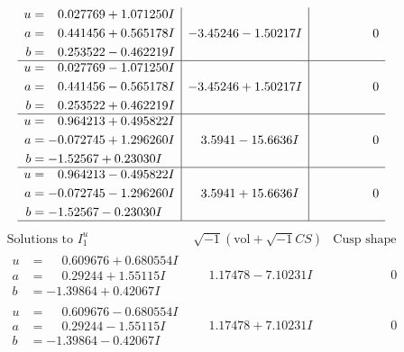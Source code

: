 \documentclass[1p]{elsarticle_modified}
\theoremstyle{definition}
\newcommand{\I}{\sqrt{-1}}
\begin{document}
$$\begin{array}{c|c|c}
\begin{aligned}
u &= \phantom{-}0.027769 + 1.071250 I \\
a &= \phantom{-}0.441456 + 0.565178 I \\
b &= \phantom{-}0.253522 - 0.462219 I\end{aligned}
 & -3.45246 - 1.50217 I & \phantom{-0.000000 } 0 \\ \hline\begin{aligned}
u &= \phantom{-}0.027769 - 1.071250 I \\
a &= \phantom{-}0.441456 - 0.565178 I \\
b &= \phantom{-}0.253522 + 0.462219 I\end{aligned}
 & -3.45246 + 1.50217 I & \phantom{-0.000000 } 0 \\ \hline\begin{aligned}
u &= \phantom{-}0.964213 + 0.495822 I \\
a &= -0.072745 + 1.296260 I \\
b &= -1.52567 + 0.23030 I\end{aligned}
 & \phantom{-}3.5941 - 15.6636 I & \phantom{-0.000000 } 0 \\ \hline\begin{aligned}
u &= \phantom{-}0.964213 - 0.495822 I \\
a &= -0.072745 - 1.296260 I \\
b &= -1.52567 - 0.23030 I\end{aligned}
 & \phantom{-}3.5941 + 15.6636 I & \phantom{-0.000000 } 0\\
 \hline 
 \end{array}$$\newpage$$\begin{array}{c|c|c}  
\text{Solutions to }I^u_{1}& \I (\text{vol} + \sqrt{-1}CS) & \text{Cusp shape}\\
 \hline 
\begin{aligned}
u &= \phantom{-}0.609676 + 0.680554 I \\
a &= \phantom{-}0.29244 + 1.55115 I \\
b &= -1.39864 + 0.42067 I\end{aligned}
 & \phantom{-}1.17478 - 7.10231 I & \phantom{-0.000000 } 0 \\ \hline\begin{aligned}
u &= \phantom{-}0.609676 - 0.680554 I \\
a &= \phantom{-}0.29244 - 1.55115 I \\
b &= -1.39864 - 0.42067 I\end{aligned}
 & \phantom{-}1.17478 + 7.10231 I & \phantom{-0.000000 } 0 \\ \hline\begin{aligned}

\end{aligned}
\end{array}$$
\end{document}
